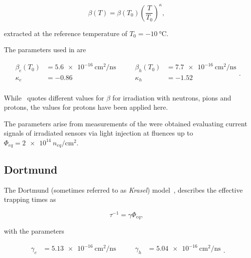 \begin{equation*}
  \beta(T) = \beta(T_0)\left(\frac{T}{T_0}\right)^{\kappa},
\end{equation*}

extracted at the reference temperature of $T_0 = \SI{-10}{\celsius}$.

The parameters used in \apsq are

\begin{equation*}
    \begin{split}
        \beta_{e}(T_0) &= \SI{5.6e-16}{\cm^2 \per \ns} \\
        \kappa_{e}   &= -0.86 \\
    \end{split}
    \qquad
    \begin{split}
        \beta_{h}(T_0) &= \SI{7.7e-16}{\cm^2 \per \ns} \\
        \kappa_{h}   &= -1.52 \\
    \end{split}.
\end{equation*}

While~\cite{kramberger} quotes different values for $\beta$ for irradiation with neutrons, pions and protons, the values for protons have been applied here.

The parameters arise from measurements of the were obtained evaluating current signals of irradiated sensors via light injection at fluences up to $\Phi_{eq} = \SI{2e14}{n_{eq} \per \cm^2}$.


\subsection{Dortmund}

The Dortmund (sometimes referred to as \textit{Krasel}) model~\cite{dortmundTrapping}, describes the effective trapping times as

\begin{equation*}
    \tau^{-1} = \gamma\Phi_{eq} ,
\end{equation*}

with the parameters

\begin{equation*}
    \begin{split}
        \gamma_{e} &= \SI{5.13e-16}{\cm^2 \per \ns} \\
    \end{split}
    \qquad
    \begin{split}
        \gamma_{h} &= \SI{5.04e-16}{\cm^2 \per \ns} \\
    \end{split}.
\end{equation*}

